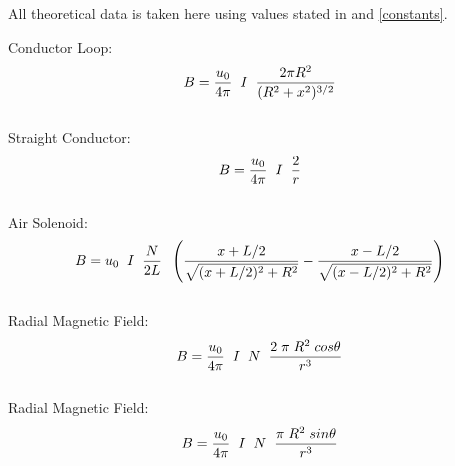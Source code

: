 \documentclass[12pt]{article}
\begin{document}
All theoretical data is taken here using values stated in \cite{Exp.5-Lab_book} and \cref{constants}.

Conductor Loop:
\begin{equation}
 \centering
 B = \dfrac{u_0}{4\pi}\hspace{0.2cm}  I \hspace{0.2cm} \dfrac{2 \pi R^2}{(R^2+x^2)^{3/2}}
 \label{Conductor Loop Eq}
\end{equation} \\

Straight Conductor:
\begin{equation}
 \centering
 B = \dfrac{u_0}{4\pi}\hspace{0.2cm}  I \hspace{0.2cm} \dfrac{2}{r}
 \label{Straight Conductor Eq}
\end{equation} \\

Air Solenoid:
\begin{equation}
 \centering
 B = u_0 \hspace{0.2cm} I \hspace{0.2cm} \dfrac{N}{2L}\hspace{0.2cm}  \left( \dfrac{x+L/2}{{\sqrt{(x+L/2)^2+R^2}}}-\dfrac{x-L/2}{{\sqrt{(x-L/2)^2+R^2}}} \right)
 \label{Air Solenoid Eq}
\end{equation} \\

Radial Magnetic Field:
\begin{equation}
 \centering
 B = \dfrac{u_0}{4\pi}\hspace{0.2cm}  I \hspace{0.2cm} N \hspace{0.2cm} \dfrac{2\hspace{0.1cm}\pi \hspace{0.1cm}R^2 \hspace{0.1cm}cos\theta}{r^3}
 \label{Radial Magnetic Eq}
\end{equation} \\

Radial Magnetic Field:
\begin{equation}
 \centering
 B = \dfrac{u_0}{4\pi}\hspace{0.2cm}  I \hspace{0.2cm} N \hspace{0.2cm} \dfrac{\pi \hspace{0.1cm}R^2 \hspace{0.1cm}sin\theta}{r^3}
 \label{Tangential Magentic Eq}
\end{equation} \\
\end{document}
